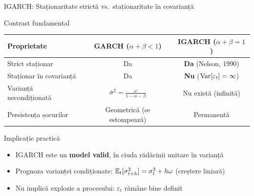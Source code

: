 \documentclass[9pt, aspectratio=169, t]{beamer}
\begin{document}
\begin{frame}{IGARCH: Staționaritate strictă vs.\ staționaritate în covarianță}
    \small
        \vspace{-2mm}
        \begin{block}{Contrast fundamental}
            \renewcommand{\arraystretch}{1.2}
            \begin{center}
            \begin{tabular}{lcc}
                \toprule
                \textbf{Proprietate} & \textbf{GARCH} ($\alpha + \beta < 1$) & \textbf{IGARCH} ($\alpha + \beta = 1$) \\
                \midrule
                Strict staționar & Da & \textbf{Da} (Nelson, 1990) \\
                Staționar în covarianță & Da & \textbf{Nu} ($\text{Var}[\varepsilon_t] = \infty$) \\
                Varianță necondiționată & $\bar{\sigma}^2 = \frac{\omega}{1 - \alpha - \beta}$ & Nu există (infinită) \\
                Persistența șocurilor & Geometrică (se estompează) & Permanentă \\
                \bottomrule
            \end{tabular}
            \end{center}
        \end{block}
        \vspace{-1mm}
        \begin{alertblock}{Implicație practică}
            \begin{itemize}
                \item IGARCH este un \textbf{model valid}, în ciuda rădăcinii unitare în varianță
                \item Prognoza varianței condiționate: $\mathbb{E}_t[\sigma_{t+h}^2] = \sigma_t^2 + h\omega$ (creștere liniară)
                \item Nu implică explozie a procesului: $\varepsilon_t$ rămâne bine definit
            \end{itemize}
        \end{alertblock}
        \hfill{}
\end{frame}
\end{document}
